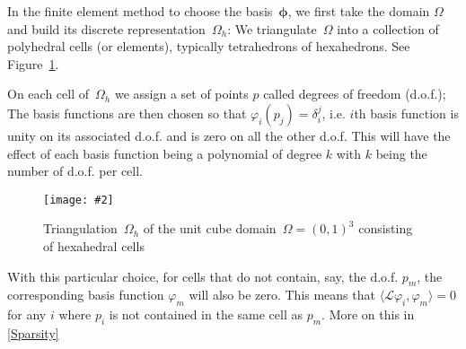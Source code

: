\documentclass[12pt]{article}
\newcommand{\includegraphicsw}[2][1.]{\texttt{[image: \#2]}}
\newcommand{\vect}[1]{\boldsymbol{\mathbf{#1}}}
\newcommand{\AZ}[1]{{\color{red}\textbf{AZ}:~#1}}
\begin{document}
In the finite element method to choose the basis~$\vect\phi$, we first take the domain $\Omega$ and build its discrete representation~$\Omega_h$: We triangulate~$\Omega$ into a collection of polyhedral cells (or elements), typically tetrahedrons of hexahedrons. See Figure~\ref{fig:mesh}.

%

On each cell of~$\Omega_h$ we assign a set of points $p$ called degrees of freedom (d.o.f.); The basis functions are then chosen so that $\varphi_{i}(p_{j}) = \delta_{i}^{j}$, i.e. $i$th basis function is unity on its associated d.o.f. and is zero on all the other d.o.f. This will have the effect of each basis function being a polynomial of degree $k$ with $k$ being the number of d.o.f. per cell.


\begin{figure}[H]
	\centering
	\includegraphicsw[.4]{mesh.png}
	\caption{Triangulation~$\Omega_h$ of the unit cube domain~$\Omega = (0, 1)^{3}$ consisting of hexahedral cells}\label{fig:mesh}
\end{figure}

With this particular choice, for cells that do not contain, say, the d.o.f. $p_{m}$, the corresponding basis function $\varphi_{m}$ will also be zero. This means that $\langle \mathcal{L}\varphi_{i}, \varphi_{m}\rangle = 0$ for any $i$ where $p_{i}$ is not contained in the same cell as $p_{m}$. More on this in \ref{Sparsity}
\end{document}
